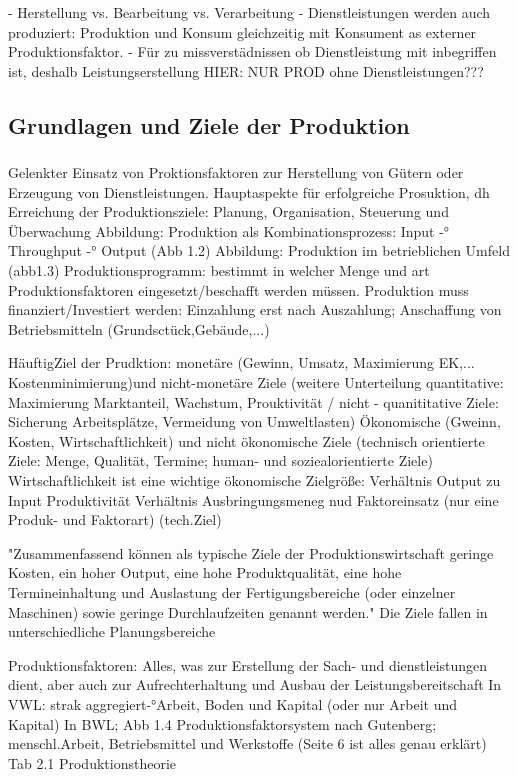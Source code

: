 \documentclass[a4paper,12pt, german]{report}
\begin{document}
- Herstellung vs. Bearbeitung vs. Verarbeitung
- Dienstleistungen werden auch produziert: Produktion und Konsum gleichzeitig mit Konsument as externer Produktionsfaktor. 
- Für zu missverstädnissen ob Dienstleistung mit inbegriffen ist, deshalb Leistungserstellung
HIER: NUR PROD ohne Dienstleistungen???

\subsection{Grundlagen und Ziele der Produktion}

\subsubsection{}
Gelenkter Einsatz von Proktionsfaktoren zur Herstellung von Gütern oder Erzeugung von Dienstleistungen. Hauptaspekte für erfolgreiche Prosuktion, dh Erreichung der Produktionsziele: Planung, Organisation, Steuerung und Überwachung 
Abbildung: Produktion als Kombinationsprozess: Input -° Throughput -° Output (Abb 1.2)
Abbildung: Produktion im betrieblichen Umfeld (abb1.3)
Produktionsprogramm: bestimmt in welcher Menge und art Produktionsfaktoren eingesetzt/beschafft werden müssen.
Produktion muss finanziert/Investiert werden: Einzahlung erst nach Auszahlung; Anschaffung von Betriebsmitteln (Grundsctück,Gebäude,...)
\cite{07}

HäuftigZiel der Prudktion: monetäre (Gewinn, Umsatz, Maximierung EK,... Kostenminimierung)und nicht-monetäre Ziele (weitere Unterteilung quantitative: Maximierung Marktanteil, Wachstum, Prouktivität / nicht - quanititative Ziele: Sicherung Arbeitsplätze, Vermeidung von Umweltlasten) 
Ökonomische (Gweinn, Kosten, Wirtschaftlichkeit) und nicht ökonomische Ziele (technisch orientierte Ziele: Menge, Qualität, Termine; human- und soziealorientierte Ziele)
Wirtschaftlichkeit ist eine wichtige ökonomische Zielgröße: Verhältnis Output zu Input
Produktivität Verhältnis Ausbringungsmeneg nud Faktoreinsatz (nur eine Produk- und Faktorart) (tech.Ziel)

"Zusammenfassend können als typische Ziele der Produktionswirtschaft geringe Kosten,
ein hoher Output, eine hohe Produktqualität, eine hohe Termineinhaltung und Auslastung
der Fertigungsbereiche (oder einzelner Maschinen) sowie geringe Durchlaufzeiten
genannt werden." Die Ziele fallen in unterschiedliche Planungsbereiche

Produktionsfaktoren: 
Alles, was zur Erstellung der Sach- und dienstleistungen dient, aber auch zur Aufrechterhaltung und Ausbau der Leistungsbereitschaft
In VWL: strak aggregiert-°Arbeit, Boden und Kapital (oder nur Arbeit und Kapital)
In BWL; Abb 1.4 Produktionsfaktorsystem nach Gutenberg; menschl.Arbeit, Betriebsmittel und Werkstoffe (Seite 6 ist alles genau erklärt)
Tab 2.1 Produktionstheorie
\end{document}
